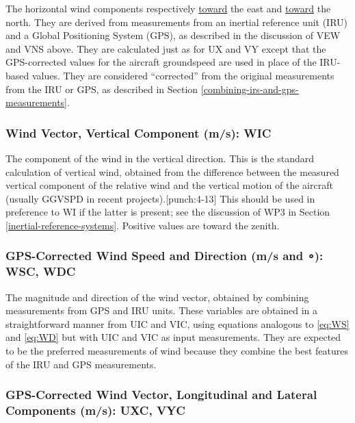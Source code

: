 \documentclass[
  english,
]{book}
\begin{document}
The horizontal wind components respectively \underline{toward} the east and \underline{toward} the north. They are derived from measurements from an inertial reference unit (IRU) and a Global Positioning System (GPS), as described in the discussion of VEW and VNS above. They are calculated just as for UX and VY except that the GPS-corrected values for the aircraft groundspeed are used in place of the IRU-based values. They are considered ``corrected'' from the original measurements from the IRU or GPS, as described in Section \ref{combining-irs-and-gps-measurements}.

\hypertarget{wic}{%
\subsubsection*{Wind Vector, Vertical Component (m/s): WIC}\label{wic}}

The component of the wind in the vertical direction. This is the standard calculation of vertical wind, obtained from the difference between the measured vertical component of the relative wind and the vertical motion of the aircraft (usually GGVSPD in recent projects).\protect\hypertarget{punch:4-13}{}{{[}punch:4-13{]}} This should be used in preference to WI if the latter is present; see the discussion of WP3 in Section \ref{inertial-reference-systems}. Positive values are toward the zenith.

\hypertarget{wsc-wdc}{%
\subsubsection*{\texorpdfstring{GPS-Corrected Wind Speed and Direction (m/s and {∘}): WSC, WDC}{GPS-Corrected Wind Speed and Direction (m/s and ∘): WSC, WDC}}\label{wsc-wdc}}

The magnitude and direction of the wind vector, obtained by combining measurements from GPS and IRU units. These variables are obtained in a straightforward manner from UIC and VIC, using equations analogous to \eqref{eq:WS} and \eqref{eq:WD} but with UIC and VIC as input measurements. They are expected to be the preferred measurements of wind because they combine the best features of the IRU and GPS measurements.

\hypertarget{uxc-vyc}{%
\subsubsection*{GPS-Corrected Wind Vector, Longitudinal and Lateral Components (m/s): UXC, VYC}\label{uxc-vyc}}
\end{document}
